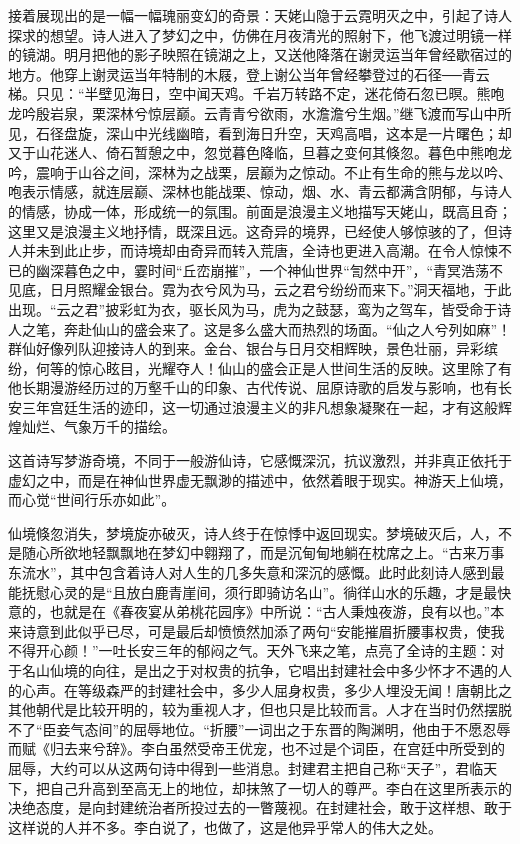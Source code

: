 \documentclass[letterpaper,10pt,english]{sphinxmanual}
\begin{document}
接着展现出的是一幅一幅瑰丽变幻的奇景：天姥山隐于云霓明灭之中，引起了诗人探求的想望。诗人进入了梦幻之中，仿佛在月夜清光的照射下，他飞渡过明镜一样的镜湖。明月把他的影子映照在镜湖之上，又送他降落在谢灵运当年曾经歇宿过的地方。他穿上谢灵运当年特制的木屐，登上谢公当年曾经攀登过的石径──青云梯。只见：“半壁见海日，空中闻天鸡。千岩万转路不定，迷花倚石忽已暝。熊咆龙吟殷岩泉，栗深林兮惊层巅。云青青兮欲雨，水澹澹兮生烟。”继飞渡而写山中所见，石径盘旋，深山中光线幽暗，看到海日升空，天鸡高唱，这本是一片曙色；却又于山花迷人、倚石暂憩之中，忽觉暮色降临，旦暮之变何其倏忽。暮色中熊咆龙吟，震响于山谷之间，深林为之战栗，层巅为之惊动。不止有生命的熊与龙以吟、咆表示情感，就连层巅、深林也能战栗、惊动，烟、水、青云都满含阴郁，与诗人的情感，协成一体，形成统一的氛围。前面是浪漫主义地描写天姥山，既高且奇；这里又是浪漫主义地抒情，既深且远。这奇异的境界，已经使人够惊骇的了，但诗人并未到此止步，而诗境却由奇异而转入荒唐，全诗也更进入高潮。在令人惊悚不已的幽深暮色之中，霎时间“丘峦崩摧”，一个神仙世界“訇然中开”，“青冥浩荡不见底，日月照耀金银台。霓为衣兮风为马，云之君兮纷纷而来下。”洞天福地，于此出现。“云之君”披彩虹为衣，驱长风为马，虎为之鼓瑟，鸾为之驾车，皆受命于诗人之笔，奔赴仙山的盛会来了。这是多么盛大而热烈的场面。“仙之人兮列如麻”！群仙好像列队迎接诗人的到来。金台、银台与日月交相辉映，景色壮丽，异彩缤纷，何等的惊心眩目，光耀夺人！仙山的盛会正是人世间生活的反映。这里除了有他长期漫游经历过的万壑千山的印象、古代传说、屈原诗歌的启发与影响，也有长安三年宫廷生活的迹印，这一切通过浪漫主义的非凡想象凝聚在一起，才有这般辉煌灿烂、气象万千的描绘。

这首诗写梦游奇境，不同于一般游仙诗，它感慨深沉，抗议激烈，并非真正依托于虚幻之中，而是在神仙世界虚无飘渺的描述中，依然着眼于现实。神游天上仙境，而心觉“世间行乐亦如此”。

仙境倏忽消失，梦境旋亦破灭，诗人终于在惊悸中返回现实。梦境破灭后，人，不是随心所欲地轻飘飘地在梦幻中翱翔了，而是沉甸甸地躺在枕席之上。“古来万事东流水”，其中包含着诗人对人生的几多失意和深沉的感慨。此时此刻诗人感到最能抚慰心灵的是“且放白鹿青崖间，须行即骑访名山”。徜徉山水的乐趣，才是最快意的，也就是在《春夜宴从弟桃花园序》中所说：“古人秉烛夜游，良有以也。”本来诗意到此似乎已尽，可是最后却愤愤然加添了两句“安能摧眉折腰事权贵，使我不得开心颜！”一吐长安三年的郁闷之气。天外飞来之笔，点亮了全诗的主题：对于名山仙境的向往，是出之于对权贵的抗争，它唱出封建社会中多少怀才不遇的人的心声。在等级森严的封建社会中，多少人屈身权贵，多少人埋没无闻！唐朝比之其他朝代是比较开明的，较为重视人才，但也只是比较而言。人才在当时仍然摆脱不了“臣妾气态间”的屈辱地位。“折腰”一词出之于东晋的陶渊明，他由于不愿忍辱而赋《归去来兮辞》。李白虽然受帝王优宠，也不过是个词臣，在宫廷中所受到的屈辱，大约可以从这两句诗中得到一些消息。封建君主把自己称“天子”，君临天下，把自己升高到至高无上的地位，却抹煞了一切人的尊严。李白在这里所表示的决绝态度，是向封建统治者所投过去的一瞥蔑视。在封建社会，敢于这样想、敢于这样说的人并不多。李白说了，也做了，这是他异乎常人的伟大之处。
\end{document}

